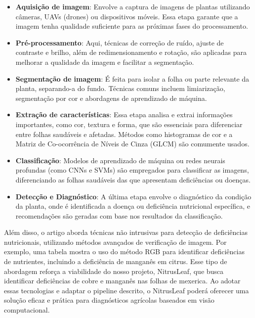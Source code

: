 \begin{itemize} 
    \item \textbf{Aquisição de imagem}: Envolve a captura de imagens de plantas utilizando câmeras, UAVs (drones) ou dispositivos móveis. Essa etapa garante que a imagem tenha qualidade suficiente para as próximas fases do processamento. \item \textbf{Pré-processamento}: Aqui, técnicas de correção de ruído, ajuste de contraste e brilho, além de redimensionamento e rotação, são aplicadas para melhorar a qualidade da imagem e facilitar a segmentação. 
    \item \textbf{Segmentação de imagem}: É feita para isolar a folha ou parte relevante da planta, separando-a do fundo. Técnicas comuns incluem limiarização, segmentação por cor e abordagens de aprendizado de máquina. \item \textbf{Extração de características}: Essa etapa analisa e extrai informações importantes, como cor, textura e forma, que são essenciais para diferenciar entre folhas saudáveis e afetadas. Métodos como histogramas de cor e a Matriz de Co-ocorrência de Níveis de Cinza (GLCM) são comumente usados. 
    \item \textbf{Classificação}: Modelos de aprendizado de máquina ou redes neurais profundas (como CNNs e SVMs) são empregados para classificar as imagens, diferenciando as folhas saudáveis das que apresentam deficiências ou doenças. 
    \item \textbf{Detecção e Diagnóstico}: A última etapa envolve o diagnóstico da condição da planta, onde é identificada a doença ou deficiência nutricional específica, e recomendações são geradas com base nos resultados da classificação.
\end{itemize}

Além disso, o artigo aborda técnicas não intrusivas para detecção de deficiências nutricionais, utilizando métodos avançados de verificação de imagem. Por exemplo, uma tabela mostra o uso do método RGB para identificar deficiências de nutrientes, incluindo a deficiência de manganês em citrus. Esse tipo de abordagem reforça a viabilidade do nosso projeto, NitrusLeaf, que busca identificar deficiências de cobre e manganês nas folhas de mexerica. Ao adotar essas tecnologias e adaptar o pipeline descrito, o NitrusLeaf poderá oferecer uma solução eficaz e prática para diagnósticos agrícolas baseados em visão computacional.

